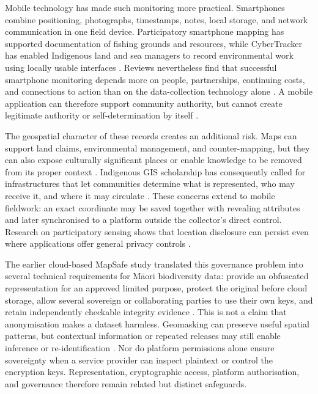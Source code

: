 \documentclass[]{interact}
\begin{document}
Mobile technology has made such monitoring more practical. Smartphones combine positioning, photographs, timestamps, notes, local storage, and network communication in one field device. Participatory smartphone mapping has supported documentation of fishing grounds and resources, while CyberTracker has enabled Indigenous land and sea managers to record environmental work using locally usable interfaces \citep{paul2016piloting,ens2012cybertracker}. Reviews nevertheless find that successful smartphone monitoring depends more on people, partnerships, continuing costs, and connections to action than on the data-collection technology alone \citep{andrachuk2019smartphone,wiseman2016monitoring,cochrane2020participatory}. A mobile application can therefore support community authority, but cannot create legitimate authority or self-determination by itself \citep{reyesgarcia2022,wilson2025selfdetermination}.

The geospatial character of these records creates an additional risk. Maps can support land claims, environmental management, and counter-mapping, but they can also expose culturally significant places or enable knowledge to be removed from its proper context \citep{wainwright2009cartography,kidd2019extra,duckham2020indigeneity}. Indigenous GIS scholarship has consequently called for infrastructures that let communities determine what is represented, who may receive it, and where it may circulate \citep{olson2016mapping,briggs2020bridging,reid2022learning}. These concerns extend to mobile fieldwork: an exact coordinate may be saved together with revealing attributes and later synchronised to a platform outside the collector's direct control. Research on participatory sensing shows that location disclosure can persist even where applications offer general privacy controls \citep{christin2011survey,christin2016privacy,boukoros2019lack,kim2022privacy}.

The earlier cloud-based MapSafe study translated this governance problem into several technical requirements for Māori biodiversity data: provide an obfuscated representation for an approved limited purpose, protect the original before cloud storage, allow several sovereign or collaborating parties to use their own keys, and retain independently checkable integrity evidence \citep{sharma2024indigenous}. This is not a claim that anonymisation makes a dataset harmless. Geomasking can preserve useful spatial patterns, but contextual information or repeated releases may still enable inference or re-identification \citep{ajayakumar2019addressing,hojati2021decentralized,kessler2018geoprivacy,cassa2008re,zimmerman2008quantifying}. Nor do platform permissions alone ensure sovereignty when a service provider can inspect plaintext or control the encryption keys. Representation, cryptographic access, platform authorisation, and governance therefore remain related but distinct safeguards.
\end{document}
